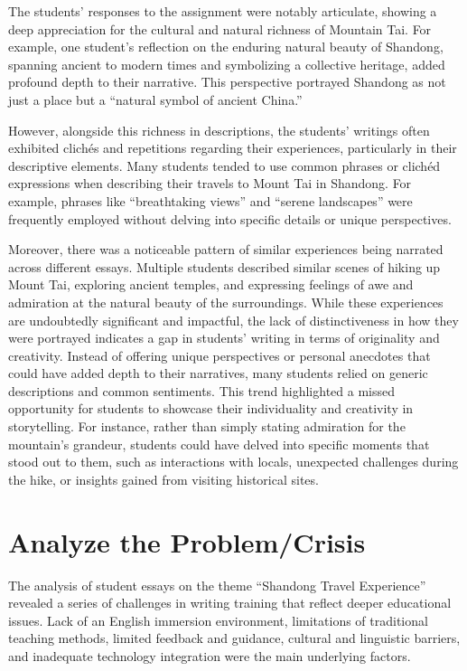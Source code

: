 \documentclass[11pt]{article}
\begin{document}
The students' responses to the assignment were notably articulate, showing a deep appreciation for the cultural and natural richness of Mountain Tai. For example, one student's reflection on the enduring natural beauty of Shandong, spanning ancient to modern times and symbolizing a collective heritage, added profound depth to their narrative. This perspective portrayed Shandong as not just a place but a ``natural symbol of ancient China.''

However, alongside this richness in descriptions, the students' writings often exhibited clichés and repetitions regarding their experiences, particularly in their descriptive elements. Many students tended to use common phrases or clichéd expressions when describing their travels to Mount Tai in Shandong. For example, phrases like ``breathtaking views'' and ``serene landscapes'' were frequently employed without delving into specific details or unique perspectives.

Moreover, there was a noticeable pattern of similar experiences being narrated across different essays. Multiple students described similar scenes of hiking up Mount Tai, exploring ancient temples, and expressing feelings of awe and admiration at the natural beauty of the surroundings. While these experiences are undoubtedly significant and impactful, the lack of distinctiveness in how they were portrayed indicates a gap in students' writing in terms of originality and creativity. Instead of offering unique perspectives or personal anecdotes that could have added depth to their narratives, many students relied on generic descriptions and common sentiments. This trend highlighted a missed opportunity for students to showcase their individuality and creativity in storytelling. For instance, rather than simply stating admiration for the mountain's grandeur, students could have delved into specific moments that stood out to them, such as interactions with locals, unexpected challenges during the hike, or insights gained from visiting historical sites.

\section{Analyze the Problem/Crisis}

The analysis of student essays on the theme ``Shandong Travel Experience'' revealed a series of challenges in writing training that reflect deeper educational issues. Lack of an English immersion environment, limitations of traditional teaching methods, limited feedback and guidance, cultural and linguistic barriers, and inadequate technology integration were the main underlying factors.
\end{document}
